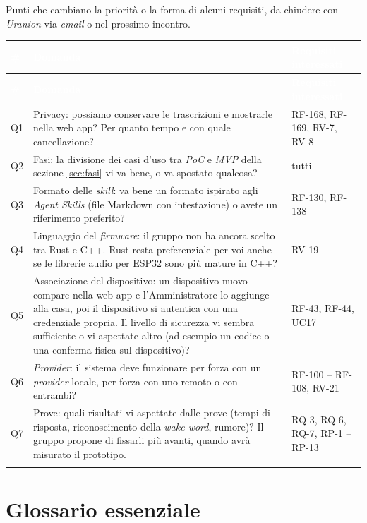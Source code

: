 \documentclass[12pt,a4paper]{article}
\newcommand{\thc}[1]{\textcolor{white}{\textbf{#1}}}
\newcommand{\rl}{\\ \arrayrulecolor{bfline}\hline}
\begin{document}
Punti che cambiano la priorità o la forma di alcuni requisiti, da chiudere con \emph{Uranion} via \emph{email} o nel prossimo incontro.

\begin{longtable}{>{\raggedright\arraybackslash}p{}>{\raggedright\arraybackslash}p{}>{\raggedright\arraybackslash}p{}}
\rowcolor{bfblue}\thc{\#} & \thc{Domanda} & \thc{Requisiti interessati} \\
\endfirsthead
\rowcolor{bfblue}\thc{\#} & \thc{Domanda} & \thc{Requisiti interessati} \\
\endhead
Q1 & Privacy: possiamo conservare le trascrizioni e mostrarle nella web app? Per quanto tempo e con quale cancellazione? & RF-168, RF-169, RV-7, RV-8 \rl
Q2 & Fasi: la divisione dei casi d'uso tra \emph{PoC} e \emph{MVP} della sezione \ref{sec:fasi} vi va bene, o va spostato qualcosa? & tutti \rl
Q3 & Formato delle \emph{skill}: va bene un formato ispirato agli \emph{Agent Skills} (file Markdown con intestazione) o avete un riferimento preferito? & RF-130, RF-138 \rl
Q4 & Linguaggio del \emph{firmware}: il gruppo non ha ancora scelto tra Rust e C++. Rust resta preferenziale per voi anche se le librerie audio per ESP32 sono più mature in C++? & RV-19 \rl
Q5 & Associazione del dispositivo: un dispositivo nuovo compare nella web app e l'Amministratore lo aggiunge alla casa, poi il dispositivo si autentica con una credenziale propria. Il livello di sicurezza vi sembra sufficiente o vi aspettate altro (ad esempio un codice o una conferma fisica sul dispositivo)? & RF-43, RF-44, UC17 \rl
Q6 & \emph{Provider}: il sistema deve funzionare per forza con un \emph{provider} locale, per forza con uno remoto o con entrambi? & RF-100 -- RF-108, RV-21 \rl
Q7 & Prove: quali risultati vi aspettate dalle prove (tempi di risposta, riconoscimento della \emph{wake word}, rumore)? Il gruppo propone di fissarli più avanti, quando avrà misurato il prototipo. & RQ-3, RQ-6, RQ-7, RP-1 -- RP-13 \rl
\end{longtable}

\section{Glossario essenziale}\label{sec:glossario}
\end{document}
